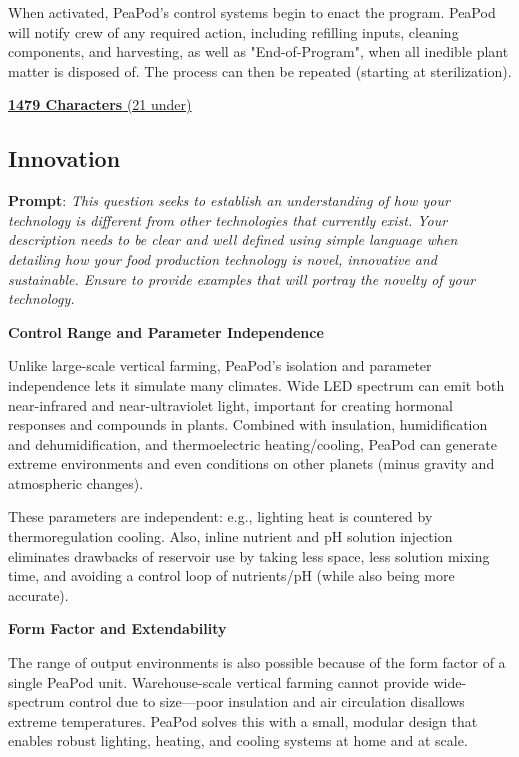 \documentclass{report}
\begin{document}
When activated, PeaPod's control systems begin to enact the program. PeaPod will notify crew of any required action, including refilling inputs, cleaning components, and harvesting, as well as "End-of-Program", when all inedible plant matter is disposed of. The process can then be repeated (starting at sterilization).

\uline{\textbf{1479 Characters} (21 under)}

\newpage

\subsection{Innovation}
\label{sec:innovation}

\textbf{Prompt}: \textit{This question seeks to establish an understanding of how your technology is different from other technologies that currently exist. Your description needs to be clear and well defined using simple language when detailing how your food production technology is novel, innovative and sustainable. Ensure to provide examples that will portray the novelty of your technology.}


\textbf{Control Range and Parameter Independence}

Unlike large-scale vertical farming, PeaPod’s isolation and parameter independence lets it simulate many climates. Wide LED spectrum can emit both near-infrared and near-ultraviolet light, important for creating hormonal responses and compounds in plants. Combined with insulation, humidification and dehumidification, and thermoelectric heating/cooling, PeaPod can generate extreme environments and even conditions on other planets (minus gravity and atmospheric changes). 

These parameters are independent: e.g., lighting heat is countered by thermoregulation cooling. Also, inline nutrient and pH solution injection eliminates drawbacks of reservoir use by taking less space, less solution mixing time, and avoiding a control loop of nutrients/pH (while also being more accurate).


\textbf{Form Factor and Extendability}

The range of output environments is also possible because of the form factor of a single PeaPod unit. Warehouse-scale vertical farming cannot provide wide-spectrum control due to size---poor insulation and air circulation disallows extreme temperatures. PeaPod solves this with a small, modular design that enables robust lighting, heating, and cooling systems at home and at scale.
\end{document}
